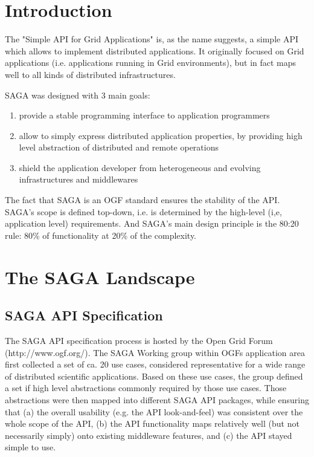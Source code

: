 \documentclass[12pt]{article}
\begin{document}
\section{Introduction}

 The "Simple API for Grid Applications"  is, as the name suggests, a
 simple API which allows to implement distributed applications.  It
 originally focused on Grid applications (i.e. applications running
 in Grid environments), but in fact maps well to all kinds of
 distributed infrastructures.

 SAGA was designed with 3 main goals:

 \begin{enumerate}

  \item provide a stable programming interface to application
  programmers
 
  \item allow to simply express distributed application properties,
  by providing high level abstraction of distributed and remote
  operations
  
  \item shield the application developer from heterogeneous and
  evolving infrastructures and middlewares

 \end{enumerate}

 The fact that SAGA is an OGF standard ensures the stability of the
 API.   SAGA's scope is defined top-down, i.e. is determined by the
 high-level (i,e, application level) requirements.  And SAGA's main
 design principle is the 80:20 rule: 80\% of functionality at 20\% of
 the complexity.


\section{The SAGA Landscape}

 \subsection{SAGA API Specification}

  The SAGA API specification process is hosted by the Open Grid Forum
  (http://www.ogf.org/).  The SAGA Working group within OGFs
  application area first collected a set of ca. 20 use cases,
  considered representative for a wide range of distributed scientific
  applications.  Based on these use cases, the group defined a set if
  high level abstractions commonly required by those use cases.  Those
  abstractions were then mapped into different SAGA API packages,
  while ensuring that (a) the overall usability (e.g. the API
  look-and-feel) was consistent over the whole scope of the API, (b)
  the API functionality maps relatively well (but not necessarily
  simply) onto existing middleware features, and (c) the API stayed
  simple to use.
\end{document}
